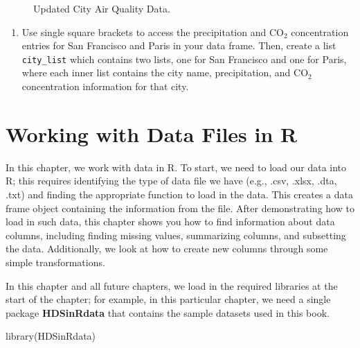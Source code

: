 \documentclass[
  letterpaper,
]{latex/krantz}
\makeatletter
\newenvironment{Shaded}{\begin{snugshade}}{\end{snugshade}}
\newcommand{\FunctionTok}[1]{\textcolor[rgb]{0.28,0.35,0.67}{#1}}
\newcommand{\NormalTok}[1]{\textcolor[rgb]{0.00,0.23,0.31}{#1}}
\providecommand{\tightlist}{%
  \setlength{\itemsep}{0pt}\setlength{\parskip}{0pt}}\usepackage{longtable,booktabs,array}
\newenvironment{kframe}{%
\medskip{}
\setlength{\fboxsep}{.8em}
 \def\at@end@of@kframe{}%
 \ifinner\ifhmode%
  \def\at@end@of@kframe{\end{minipage}}%
  \begin{minipage}{\columnwidth}%
 \fi\fi%
 \def\FrameCommand##1{\hskip\@totalleftmargin \hskip-\fboxsep
 \colorbox{shadecolor}{##1}\hskip-\fboxsep
     \hskip-\linewidth \hskip-\@totalleftmargin \hskip\columnwidth}%
 \MakeFramed {\advance\hsize-\width
   \@totalleftmargin\z@ \linewidth\hsize
   \@setminipage}}%
 {\par\unskip\endMakeFramed%
 \at@end@of@kframe}
\renewenvironment{Shaded}{\begin{kframe}}{\end{kframe}}
\makeatother
\begin{document}
\begin{figure}


\caption{\label{fig-city-air-quality-2}Updated City Air Quality Data.}

\end{figure}%

\begin{enumerate}
\def\labelenumi{\arabic{enumi}.}
\setcounter{enumi}{3}
\tightlist
\item
  Use single square brackets to access the precipitation and
  \(\text{CO}_2\) concentration entries for San Francisco and Paris in
  your data frame. Then, create a list \texttt{city\_list} which
  contains two lists, one for San Francisco and one for Paris, where
  each inner list contains the city name, precipitation, and
  \(\text{CO}_2\) concentration information for that city.
\end{enumerate}

\chapter{Working with Data Files in R}\label{sec-data-files}

In this chapter, we work with data in R. To start, we need to load our
data into R; this requires identifying the type of data file
 we have (e.g., .csv, .xlsx, .dta, .txt) and finding
the appropriate function to load in the data. This creates a data frame
object containing the information from the file. After demonstrating how
to load in such data, this chapter shows you how to find information
about data columns, including finding missing values, summarizing
columns, and subsetting the data. Additionally, we look at how to create
new columns through some simple transformations.

In this chapter and all future chapters, we load in the required
libraries at the start of the chapter; for example, in this particular
chapter, we need a single package \textbf{HDSinRdata}
 that contains the sample datasets used in
this book.

\begin{Shaded}
\begin{Highlighting}[]
\FunctionTok{library}\NormalTok{(HDSinRdata)}
\end{Highlighting}
\end{Shaded}
\end{document}
